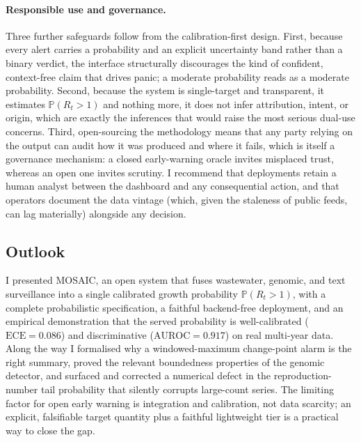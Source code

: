 \documentclass[10pt,twocolumn]{article}
\theoremstyle{definition}
\newcommand{\Rt}{R_t}
\newcommand{\Prob}{\mathbb{P}}
\begin{document}
\paragraph{Responsible use and governance.}
Three further safeguards follow from the calibration-first design. First, because
every alert carries a probability and an explicit uncertainty band rather than a
binary verdict, the interface structurally discourages the kind of confident,
context-free claim that drives panic; a moderate probability reads as a moderate
probability. Second, because the system is single-target and transparent, it
estimates $\Prob(\Rt>1)$ and nothing more, it does not infer attribution,
intent, or origin, which are exactly the inferences that would raise the most
serious dual-use concerns. Third, open-sourcing the methodology means that any
party relying on the output can audit how it was produced and where it fails,
which is itself a governance mechanism: a closed early-warning oracle invites
misplaced trust, whereas an open one invites scrutiny. I recommend that
deployments retain a human analyst between the dashboard and any consequential
action, and that operators document the data vintage (which, given the staleness
of public feeds, can lag materially) alongside any decision.

\subsection{Outlook}
\label{sec:conclusion}

I presented MOSAIC, an open system that fuses wastewater, genomic, and text
surveillance into a single calibrated growth probability $\Prob(\Rt>1)$, with a
complete probabilistic specification, a faithful backend-free deployment, and an
empirical demonstration that the served probability is well-calibrated
($\mathrm{ECE}=0.086$) and discriminative ($\mathrm{AUROC}=0.917$) on real
multi-year data. Along the way I formalised why a windowed-maximum change-point
alarm is the right summary, proved the relevant boundedness properties of the
genomic detector, and surfaced and corrected a numerical defect in the
reproduction-number tail probability that silently corrupts large-count series.
The limiting factor for open early warning is integration and calibration, not
data scarcity; an explicit, falsifiable target quantity plus a faithful
lightweight tier is a practical way to close the gap.
\end{document}
